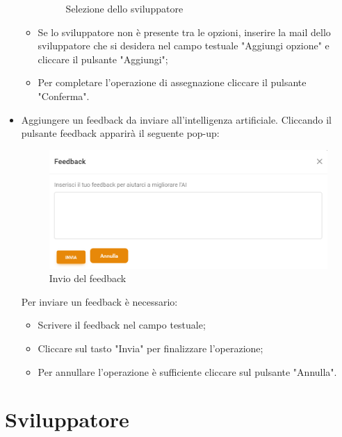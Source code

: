 \documentclass{article}
\begin{document}
\begin{itemize}
\begin{itemize}
\begin{figure}[H]
      \caption{Selezione dello sviluppatore}
      \label{seldev}
    \end{figure}
    \item Se lo sviluppatore non è presente tra le opzioni, inserire la mail dello sviluppatore che si desidera nel campo testuale "Aggiungi opzione" e cliccare il pulsante "Aggiungi";
    \item Per completare l'operazione di assegnazione cliccare il pulsante "Conferma".
    \end{itemize}
    \item Aggiungere un feedback da inviare all'intelligenza artificiale. Cliccando il pulsante feedback apparirà il seguente pop-up:
    \begin{figure}[H]
      \centering
      \includegraphics[width=\textwidth]{documenti/Screenshot manuale utente/feedback.png}
      \caption{Invio del feedback}
      \label{feedback}
    \end{figure}
    Per inviare un feedback è necessario:
    \begin{itemize}
        \item Scrivere il feedback nel campo testuale;
        \item Cliccare sul tasto "Invia" per finalizzare l'operazione;
        \item Per annullare l'operazione è sufficiente cliccare sul pulsante "Annulla".
    \end{itemize}
\end{itemize}


\section{Sviluppatore}
\end{document}
